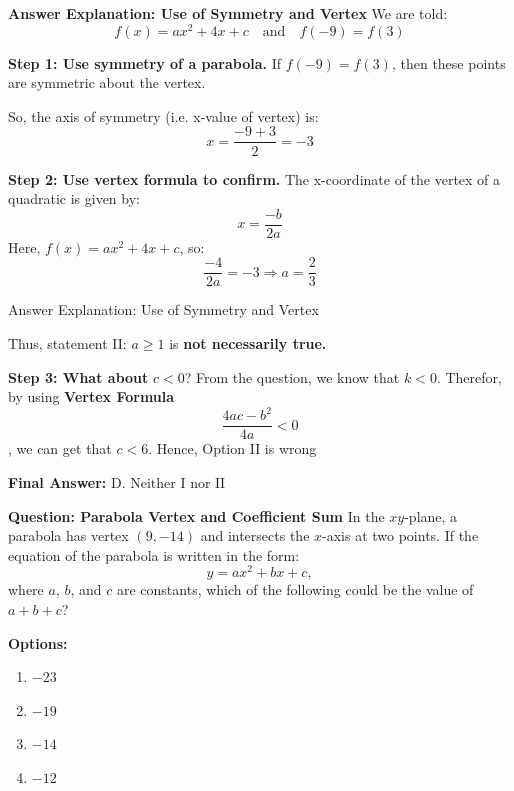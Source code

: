 \documentclass{beamer}
\begin{document}
\begin{frame}{\textbf{Answer Explanation: Use of Symmetry and Vertex}}
We are told:
\[
f(x) = ax^2 + 4x + c
\quad \text{and} \quad f(-9) = f(3)
\]

\textbf{Step 1: Use symmetry of a parabola.}  
If \(f(-9) = f(3)\), then these points are symmetric about the vertex.

So, the axis of symmetry (i.e. x-value of vertex) is:
\[
x = \frac{-9 + 3}{2} = -3
\]

\textbf{Step 2: Use vertex formula to confirm.}  
The x-coordinate of the vertex of a quadratic is given by:
\[
x = \frac{-b}{2a}
\]
Here, \(f(x) = ax^2 + 4x + c\), so:
\[
\frac{-4}{2a} = -3 \Rightarrow a = \frac{2}{3}
\]


\end{frame}

\begin{frame}{Answer Explanation: Use of Symmetry and Vertex}

Thus, statement II: \(a \geq 1\) is \textbf{not necessarily true.}

\vspace{0.3cm}
\textbf{Step 3: What about } \(c < 0\)?  
From the question, we know that \textbf{$k <0$}. Therefor, by using \textbf{Vertex Formula} \[
\frac{4ac-b^2}{4a}<0
\] , we can get that $c<6$. Hence, Option II is wrong

\vspace{0.3cm}
\textbf{Final Answer:} \(\boxed{\text{D. Neither I nor II}}\)
    
\end{frame}

\begin{frame}{\textbf{Question: Parabola Vertex and Coefficient Sum}}
In the \(xy\)-plane, a parabola has vertex \( (9, -14) \) and intersects the \(x\)-axis at two points.  
If the equation of the parabola is written in the form:
\[
y = ax^2 + bx + c,
\]
where \(a\), \(b\), and \(c\) are constants, which of the following could be the value of \(a + b + c\)?

\vspace{0.3cm}
\textbf{Options:}
\begin{enumerate}
    \item [A] \(-23\)
    \item [B] \(-19\)
    \item [C] \(-14\)
    \item [D] \(-12\)
\end{enumerate}
\end{frame}
\end{document}
